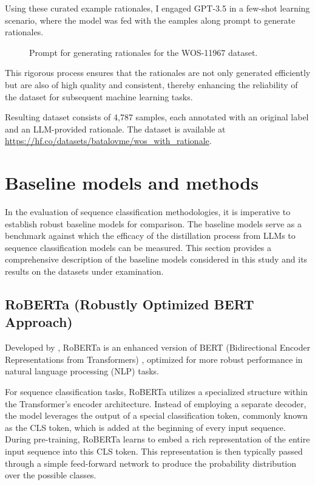 Using these curated example rationales, I engaged GPT-3.5 in a few-shot learning scenario, where the model was fed with the eamples along prompt to generate rationales.

\begin{figure}[ht!]
    \centering
    
    \caption{Prompt for generating rationales for the WOS-11967 dataset.}
    \label{fig:wos_prompt}
\end{figure}

This rigorous process ensures that the rationales are not only generated efficiently but are also of high quality and consistent, thereby enhancing the reliability of the dataset for subsequent machine learning tasks.

Resulting dataset consists of 4,787 samples, each annotated with an original label and an LLM-provided rationale. The dataset is available at \linebreak \url{https://hf.co/datasets/batalovme/wos_with_rationale}.

\section{Baseline models and methods}

In the evaluation of sequence classification methodologies, it is imperative to establish robust baseline models for comparison. The baseline models serve as a benchmark against which the efficacy of the distillation process from LLMs to sequence classification models can be measured. This section provides a comprehensive description of the baseline models considered in this study and its results on the datasets under examination.

\subsection{RoBERTa (Robustly Optimized BERT Approach)}

Developed by \citeauthor{roberta} \cite{roberta}, RoBERTa is an enhanced version of BERT (Bidirectional Encoder Representations from Transformers) \cite{bert}, optimized for more robust performance in natural language processing (NLP) tasks.

For sequence classification tasks, RoBERTa utilizes a specialized structure within the Transformer's encoder architecture. Instead of employing a separate decoder, the model leverages the output of a special classification token, commonly known as the CLS token, which is added at the beginning of every input sequence. During pre-training, RoBERTa learns to embed a rich representation of the entire input sequence into this CLS token. This representation is then typically passed through a simple feed-forward network to produce the probability distribution over the possible classes.

